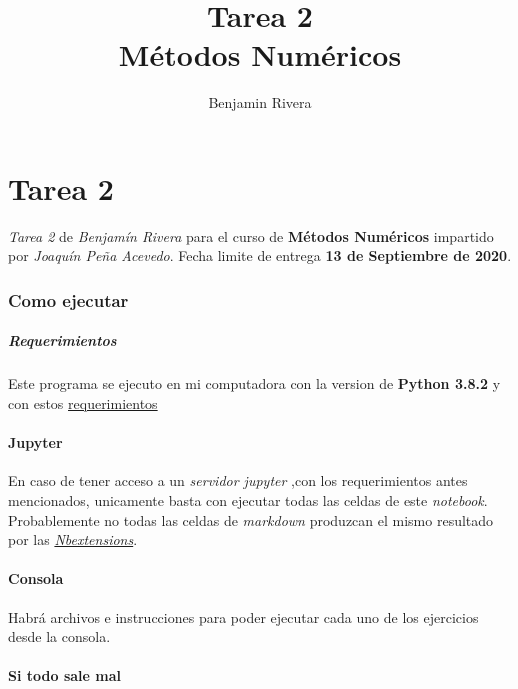 \documentclass[11pt]{article}
\title{Tarea 2\\M\'etodos Num\'ericos}
\author{Benjamin Rivera}
\begin{document}
    
    \maketitle
    \tableofcontents

 
    

    \newpage
    \hypertarget{tarea-2}{%
\section{Tarea 2}\label{tarea-2}}

	\emph{Tarea 2} de \emph{Benjamín Rivera} para el curso de
	\textbf{Métodos Numéricos} impartido por \emph{Joaquín Peña Acevedo}.
	Fecha limite de entrega \textbf{13 de Septiembre de 2020}.

		\hypertarget{como-ejecutar}{%
	\subsubsection{Como ejecutar}\label{como-ejecutar}}

		\hypertarget{requerimientos}{%
	\subparagraph{Requerimientos}\label{requerimientos}}

	Este programa se ejecuto en mi computadora con la version de
	\textbf{Python 3.8.2} y con estos
	\href{https://github.com/BenchHPZ/UG-Compu/blob/master/MN/requerimientos.txt}{requerimientos}

	\hypertarget{jupyter}{%
	\paragraph{Jupyter}\label{jupyter}}

	En caso de tener acceso a un \emph{servidor jupyter} ,con los
	requerimientos antes mencionados, unicamente basta con ejecutar todas
	las celdas de este \emph{notebook}. Probablemente no todas las celdas de
	\emph{markdown} produzcan el mismo resultado por las
	\href{jupyter-contrib-nbextensions.readthedocs.io}{\emph{Nbextensions}}.

	\hypertarget{consola}{%
	\paragraph{Consola}\label{consola}}

	Habrá archivos e instrucciones para poder ejecutar cada uno de los
	ejercicios desde la consola.

	\hypertarget{si-todo-sale-mal}{%
	\paragraph{Si todo sale mal}\label{si-todo-sale-mal}}
\end{document}
